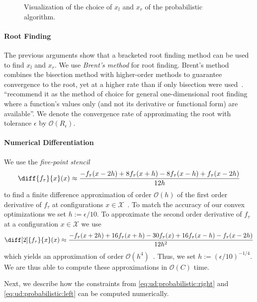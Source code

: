 \begin{figure}
    \centering
    
    \caption{Visualization of the choice of $x_l$ and $x_r$ of the probabilistic algorithm.}
    \label{fig:probabilistic_algorithm}
\end{figure}

\paragraph{Root Finding} The previous arguments show that a bracketed root finding method can be used to find $x_l$ and $x_r$. We use \emph{Brent's method} for root finding. Brent's method combines the bisection method with higher-order methods to guarantee convergence to the root, yet at a higher rate than if only bisection were used~\cite{Press2007}. \citeauthor{Press2007}~\cite{Press2007} ``recommend it as the method of choice for general one-dimensional
root finding where a function’s values only (and not its derivative or functional form)
are available''. We denote the convergence rate of approximating the root with tolerance $\epsilon$ by $\mathcal{O}(R_{\epsilon})$.

\paragraph{Numerical Differentiation} We use the \emph{five-point stencil} \begin{align*}
    \diff{f_{\tau}}{x}(x) \approx \frac{-f_{\tau}(x - 2h) + 8 f_{\tau}(x + h) - 8 f_{\tau}(x - h) + f_{\tau}(x - 2h)}{12h}
\end{align*} to find a finite difference approximation of order $\mathcal{O}(h)$ of the first order derivative of $f_{\tau}$ at configurations $x \in \mathcal{X}$~\cite{Sauer2011}. To match the accuracy of our convex optimizations we set $h := \epsilon / 10$. To approximate the second order derivative of $f_{\tau}$ at a configuration $x \in \mathcal{X}$ we use \begin{align*}
    \diff[2]{f_{\tau}}{x}(x) \approx \frac{-f_{\tau}(x + 2h) + 16 f_{\tau}(x+h) - 30 f_{\tau}(x) + 16 f_{\tau}(x-h) - f_{\tau}(x - 2h)}{12 h^2}
\end{align*} which yields an approximation of order $\mathcal{O}(h^4)$~\cite{Sauer2011}. Thus, we set $h := (\epsilon / 10)^{-1/4}$. We are thus able to compute these approximations in $\mathcal{O}(C)$ time.

Next, we describe how the constraints from \cref{eq:ud:probabilistic:right} and \cref{eq:ud:probabilistic:left} can be computed numerically.


